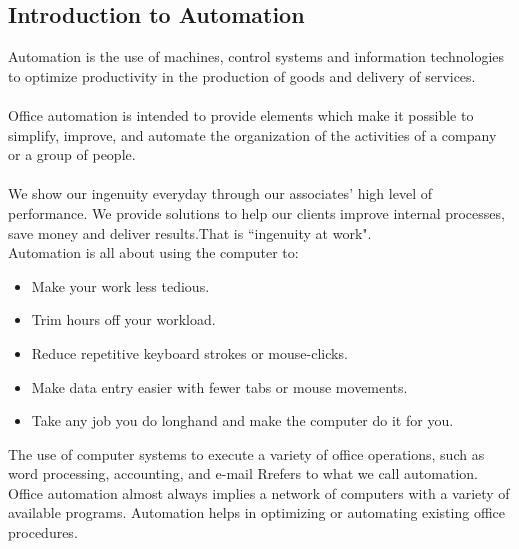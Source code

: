 \subsection{Introduction to Automation}
Automation is the use of machines, control systems and information technologies to optimize productivity in the production of goods and delivery of services.\\\\
Office automation is intended to provide elements which make it possible to simplify, improve, and automate the organization of the
activities of a company or a group of people.\\\\
We show our ingenuity everyday through our associates' high level of performance. We provide solutions to help our clients improve internal processes, save money and deliver results.That is ``ingenuity at work".\\
Automation is all about using the computer to:
\begin{itemize}
\item Make your work less tedious. 
\item Trim hours off your workload.
\item Reduce repetitive keyboard strokes or mouse-clicks.
\item Make data entry easier with fewer tabs or mouse movements.
\item Take any job you do longhand and make the computer do it for you.
\end{itemize}

The use of computer systems to execute a variety of office operations, such as word processing, accounting, and e-mail Rrefers to what we call automation. Office automation almost always implies a network of computers with a variety of available programs. Automation helps in optimizing or automating existing office procedures.
\newpage
